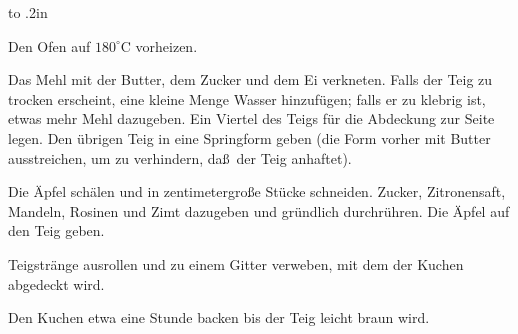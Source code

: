 \documentclass[11pt,twocolumn,a4paper]{article}
\begin{document}
\leavevmode\vbox to .2in{\vss}

Den Ofen auf $180^{\circ}$C vorheizen.

Das Mehl mit der Butter, dem Zucker und dem Ei verkneten. Falls der
Teig zu trocken erscheint, eine kleine Menge Wasser hinzuf\"ugen;
falls er zu klebrig ist, etwas mehr Mehl dazugeben. Ein Viertel des
Teigs f\"ur die Abdeckung zur Seite legen. Den \"ubrigen Teig in eine
Springform geben (die Form vorher mit Butter ausstreichen, um zu
verhindern, da\ss\ der Teig anhaftet).

Die \"Apfel sch\"alen und in zentimetergro\ss e St\"ucke
schneiden. Zucker, Zitronensaft, Mandeln, Rosinen und Zimt dazugeben
und gr\"undlich durchr\"uhren. Die \"Apfel auf den Teig geben.

Teigstr\"ange ausrollen und zu einem Gitter verweben, mit dem der
Kuchen abgedeckt wird.

Den Kuchen etwa eine Stunde backen bis der Teig leicht braun wird.
\end{document}
